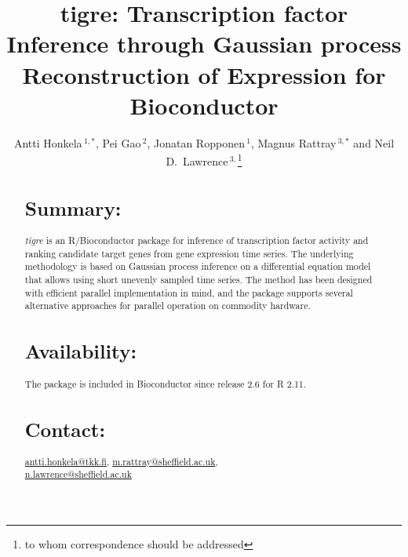 \documentclass{bioinfo}
\newcommand{\tigre}{\emph{tigre}}
\begin{document}

\title[tigre]{tigre: Transcription factor Inference through Gaussian process Reconstruction of Expression for Bioconductor}
\author[Honkela \textit{et~al.}]{Antti Honkela\,$^{1,*}$, Pei Gao\,$^{2}$, Jonatan Ropponen\,$^{1}$, Magnus Rattray\,$^{3,*}$ and Neil D.\ Lawrence\,$^{3,}$\footnote{to whom correspondence should be addressed}}
\address{$^{1}$Department of Information and Computer Science, Aalto
  University School of Science and Technology, Helsinki, Finland\\
  $^{2}$Department of of Public Health and Primary Care, University of
  Cambridge, Cambridge, UK\\
  $^{3}$ Sheffield Institute for Translational Neuroscience and
  Department of Computer Science, University of Sheffield, Sheffield, UK}



\maketitle

\begin{abstract}

\section{Summary:}
\tigre{} is an R/Bioconductor package for inference of transcription
factor activity and ranking candidate target genes from gene
expression time series.  The underlying methodology is based on
Gaussian process inference on a differential equation model that
allows using short unevenly sampled time series.  The method has been
designed with efficient parallel implementation in mind, and the
package supports several alternative approaches for parallel operation
on commodity hardware.

\section{Availability:}
The package is included in Bioconductor since release 2.6 for R 2.11.

\section{Contact:} \href{antti.honkela@tkk.fi}{antti.honkela@tkk.fi},
\href{m.rattray@sheffield.ac.uk}{m.rattray@sheffield.ac.uk},\\
\href{n.lawrence@sheffield.ac.uk}{n.lawrence@sheffield.ac.uk}
\end{abstract}
\end{document}
